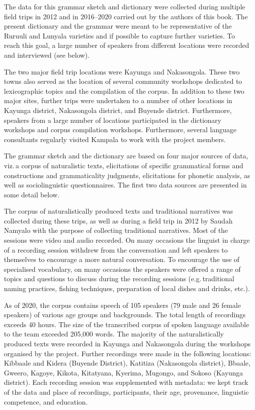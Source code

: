 The data for this grammar sketch and dictionary were collected during multiple field trips in 2012 and in 2016–2020 carried out by the authors of this book. 
The present dictionary and the grammar were meant to be representative of the Ruruuli and Lunyala varieties and if possible to capture further varieties. 
To reach this goal, a large number of speakers from different locations were recorded and interviewed (see below). 

The two major field trip locations were Kayunga and Nakasongola. These two towns also served as the location of several community workshops dedicated to lexicographic topics and the compilation of the corpus.
In addition to these two major sites, further trips were undertaken to a number of other locations in Kayunga district, Nakasongola district, and Buyende district. 
Furthermore, speakers from a large number of locations participated in the dictionary workshops and corpus compilation workshops. 
Furthermore, several language consultants regularly visited Kampala to work with the project members.

The grammar sketch and the dictionary are based on four major sources of data, viz.\,a corpus of naturalistic texts, elicitations of specific grammatical forms and constructions and grammaticality judgments, elicitations for phonetic analysis, as well as sociolinguistic questionnaires.
The first two data sources are presented in some detail below.

The corpus of naturalistically produced texts and traditional narratives was collected during these trips, as well as during a field trip in 2012 by Saudah Namyalo with the purpose of collecting traditional narratives. 
Most of the sessions were video and audio recorded. 
On many occasions the linguist in charge of a recording session withdrew from the conversation and left speakers to themselves to encourage a more natural conversation. 
To encourage the use of specialised vocabulary, on many occasions the speakers were offered a range of topics and questions to discuss during the recording sessions (e.g.\,traditional naming practices, fishing techniques, preparation of local dishes and drinks, etc.).

As of 2020, the corpus contains speech of 105 speakers (79 male and 26 female speakers) of various age groups and backgrounds. 
The total length of recordings exceeds 40 hours. 
The size of the transcribed corpus of spoken language available to the team exceeded 205,000 words.
The majority of the naturalistically produced texts were recorded in Kayunga and Nakasongola during the workshops organised by the project. 
Further recordings were made in the following locations: 
Kibbaale and Ki\-de\-ra (Buyende District),
Katitiza (Nakasongola district),
Bbaale, Gweero, Ka\-goye, Kikota, Kitatyana, Kyerima, Mugongo, and Sokoso (Kayunga district). 
Each recording session was supplemented with metadata: we kept track of the data and place of recordings, participants, their age, provenance, linguistic competence, and education.

